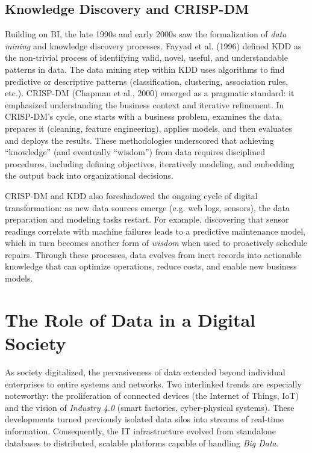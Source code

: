 \subsection{Knowledge Discovery and CRISP-DM}
Building on BI, the late 1990s and early 2000s saw the formalization of \emph{data mining} and knowledge discovery processes. Fayyad et al. (1996) defined KDD as the non-trivial process of identifying valid, novel, useful, and understandable patterns in data. The data mining step within KDD uses algorithms to find predictive or descriptive patterns (classification, clustering, association rules, etc.). CRISP-DM (Chapman et al., 2000) emerged as a pragmatic standard: it emphasized understanding the business context and iterative refinement. In CRISP-DM’s cycle, one starts with a business problem, examines the data, prepares it (cleaning, feature engineering), applies models, and then evaluates and deploys the results. These methodologies underscored that achieving “knowledge” (and eventually “wisdom”) from data requires disciplined procedures, including defining objectives, iteratively modeling, and embedding the output back into organizational decisions.

CRISP-DM and KDD also foreshadowed the ongoing cycle of digital transformation: as new data sources emerge (e.g. web logs, sensors), the data preparation and modeling tasks restart. For example, discovering that sensor readings correlate with machine failures leads to a predictive maintenance model, which in turn becomes another form of \emph{wisdom} when used to proactively schedule repairs. Through these processes, data evolves from inert records into actionable knowledge that can optimize operations, reduce costs, and enable new business models.

\section{The Role of Data in a Digital Society}
As society digitalized, the pervasiveness of data extended beyond individual enterprises to entire systems and networks. Two interlinked trends are especially noteworthy: the proliferation of connected devices (the Internet of Things, IoT) and the vision of \emph{Industry 4.0} (smart factories, cyber-physical systems). These developments turned previously isolated data silos into streams of real-time information. Consequently, the IT infrastructure evolved from standalone databases to distributed, scalable platforms capable of handling \emph{Big Data}.

